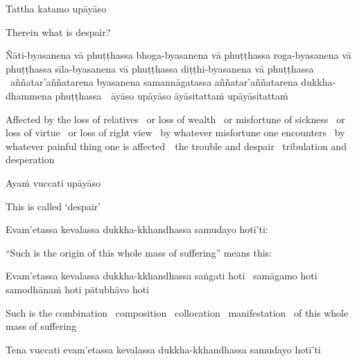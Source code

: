 Tattha katamo upāyāso

\begin{english}
  Therein what is despair?
\end{english}

\begin{pali-hang}
  Ñāti-byasanena vā phuṭṭhassa bhoga-byasanena vā phuṭṭhassa roga-byasanena vā phuṭṭhassa sīla-byasanena vā phuṭṭhassa diṭṭhi-byasanena vā phuṭṭhassa \breathmark\ aññatar'aññatarena byasanena samannāgatassa aññatar'aññatarena dukkha-dhammena \mbox{phuṭṭhassa}~\breathmark\ āyāso upāyāso āyāsitattaṁ upāyāsitattaṁ
\end{pali-hang}

\begin{english-hang-verses}
  Affected by the loss of relatives \breathmark\ or loss of wealth \breathmark\ or misfortune of sickness \breathmark\ or loss of virtue \breathmark\ or loss of right view \breathmark\ by whatever misfortune one encounters \breathmark\ by whatever painful thing one is \mbox{affected}~\breathmark\ the trouble and despair \breathmark\ tribulation and desperation
\end{english-hang-verses}

Ayaṁ vuccati upāyāso

\begin{english}
  This is called `despair'
\end{english}

Evam'etassa kevalassa dukkha-kkhandhassa samudayo hotī'ti:

\begin{english}
  ``Such is the origin of this whole mass of suffering'' means this:
\end{english}

\begin{pali-hang}
  Evam'etassa kevalassa dukkha-kkhandhassa saṅgati hoti \breathmark\ samāgamo hoti samodhānaṁ hoti pātubhāvo hoti
\end{pali-hang}

\begin{english-hang}
  Such is the combination \breathmark\ composition \breathmark\ collocation \breathmark\ manifestation \breathmark\ of this whole mass of suffering
\end{english-hang}

\begin{pali-hang}
  Tena vuccati evam'etassa kevalassa dukkha-kkhandhassa samudayo hotī'ti
\end{pali-hang}

